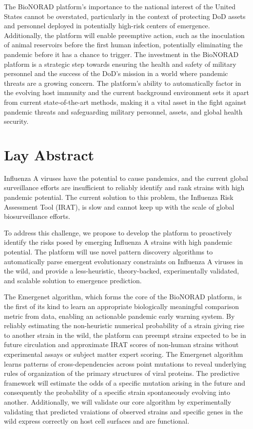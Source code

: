 \documentclass[onecolumn, compsoc,12pt]{IEEEtran}
\begin{document}
The BioNORAD platform's importance to the national interest of the United States cannot be overstated, particularly in the context of protecting DoD assets and personnel deployed in potentially high-risk centers of emergence. Additionally, the platform will enable preemptive action, such as the inoculation of animal reservoirs before the first human infection, potentially eliminating the pandemic before it has a chance to trigger. The investment in the BioNORAD platform is a strategic step towards ensuring the health and safety of military personnel and the success of the DoD's mission in a world where pandemic threats are a growing concern.  The platform's ability to automatically factor in the evolving host immunity and the current background environment sets it apart from current state-of-the-art methods, making it a vital asset in the fight against pandemic threats and safeguarding military personnel, assets, and global health security.

\clearpage

\section*{Lay Abstract}

Influenza A viruses have the potential to cause pandemics, and the current global surveillance efforts are insufficient to reliably identify and rank strains with high pandemic potential. The current solution to this problem, the Influenza Risk Assessment Tool (IRAT), is slow and cannot keep up with the scale of global biosurveillance efforts.

To address this challenge, we propose to develop the \bnd  platform to proactively identify the risks posed by emerging Influenza A strains with high pandemic potential. The platform will use novel pattern discovery algorithms to automatically parse emergent evolutionary constraints on Influenza A viruses in the wild, and provide a less-heuristic, theory-backed, experimentally validated, and scalable solution to emergence prediction.

The Emergenet algorithm, which forms the core of the BioNORAD platform, is the first of its kind to learn an appropriate biologically meaningful comparison metric from data, enabling an actionable pandemic early warning system. By reliably estimating the non-heuristic numerical probability of a strain giving rise to another strain in the wild, the platform can preempt strains expected to be in future circulation and approximate IRAT scores of non-human strains without experimental assays or subject matter expert scoring. The Emergenet algorithm learns patterns of cross-dependencies across point mutations to reveal underlying rules of organization of the primary structures of viral proteins. The predictive framework will estimate the odds of a specific mutation arising in the future and consequently the probability of a specific strain spontaneously evolving into another. Additionally, we will validate our core algorithm by experimentally validating that predicted vraiations of observed strains and specific genes in the wild express correctly on host cell surfaces and are functional.
\end{document}
